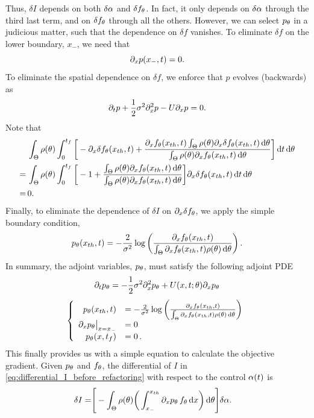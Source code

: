 Thus, $\delta I$ depends on both $\delta \alpha$ and $\delta f_{ \theta}$. 
In fact, it only depends on $\delta \alpha$ through the third last term, and on
$\delta f_{ \theta}$ through all the others.
However, we can select $p_{ \theta}$ in a judicious matter, such that the
dependence on $\delta f$ vanishes. To eliminate $\delta f$ on the lower boundary,
$x_-$, we need that $$ {\partial}_xp(x_-,t)=0.$$
To eliminate the spatial dependence on $\delta f$, we 
enforce that $p$ evolves (backwards) as $${\partial}_t p + \frac{1
}{2}\sigma^2{\partial}_x^2p - U {\partial}_x p = 0.$$
Note that
\begin{align*}
&\, \int_\Theta  \rho({ \theta}) \int_0^{{ t_f }} \bigg[ 
-  {\partial}_x
		\delta f_{ \theta}({ x_{th} }, t)
+    \frac{ {\partial}_x f_{ \theta}({ x_{th} }, t) \int_\Theta \rho({ \theta}) {\partial}_x \delta f_{ \theta}({ x_{th} }, t) 	\, \mathrm{d} { \theta}}{	{\int_\Theta \rho({ \theta}){\partial}_xf_{ \theta}({ x_{th} },
	t)\, \mathrm{d} { \theta} }} 
		 	 \bigg] \, \mathrm{d} t	\, \mathrm{d} { \theta}	   
 \\
 =& \, 
 \int_\Theta  \rho({ \theta}) \int_0^{{ t_f }}  
\bigg[ - 1+    \frac{ \int_\Theta \rho({ \theta}){\partial}_x f_{ \theta}({ x_{th} }, t)\, \mathrm{d} { \theta}}
	     		{	{\int_\Theta \rho({ \theta}){\partial}_xf_{ \theta}({ x_{th} },
                            t)\, \mathrm{d} { \theta} }} 
		 \bigg]   {\partial}_x \delta f_{ \theta}({ x_{th} }, t)	\, \mathrm{d} t
                 \, \mathrm{d} { \theta}	\\
=& \, 0.		 
\end{align*}
Finally, to eliminate the dependence of  $\delta
I$ on ${\partial}_x \delta f_{ \theta}$, we apply the simple boundary
condition, 
$$ p_{ \theta}({ x_{th} },t) = - \frac{2}{\sigma^2} \log\left( \frac{{\partial}_xf_{ \theta}({ x_{th} }, t)}
						{\int_\Theta {\partial}_xf_{ \theta}({ x_{th} }, t)\rho({ \theta})\, \mathrm{d} { \theta} } \right) .$$
In summary, the adjoint variables, $p_{ \theta}$, must satisfy the following adjoint
PDE
\begin{equation*}
{\partial}_t p_{ \theta} =   -\frac{1 }{2}\sigma^2 {\partial}^2_x p_{ \theta} +U(x,t;{ \theta})   {\partial}_x p_{ \theta} \nonumber
\end{equation*}
\begin{equation}
\left \{ \begin{array}{rl}
p_{ \theta} ({ x_{th} },t) &=  - \frac{2}{\sigma^2}\log\left( 
\frac{{\partial}_xf_{ \theta}({ x_{th} }, t)}{\int_\Theta {\partial}_xf_{ \theta}({ x_{th} }, t)\rho({ \theta})\, \mathrm{d} { \theta} } \right) \\
{\partial}_x p_{ \theta}  \big |_{x={ x_{-} }} &= 0\\
p_{ \theta}(x,{ t_f }) &= 0\,.\\
\end{array} \right .
\label{eq:adjoint_pde_OU}
\end{equation}
This finally provides us with a simple equation to calculate the
objective gradient. 
Given $p_{ \theta}$ and $f_{ \theta}$, the differential of $I$ in
\cref{eq:differential_I_before_refactoring} with respect to the
control $\alpha(t)$ is 
\begin{align}
\delta I =&  \Bigg[
-\int_\Theta  \rho({ \theta})  \bigg(  
 \int_{ x_{-} }^{{ x_{th} }} {\partial}_x p_{ \theta} \, f_{ \theta} \, \mathrm{d} x 
    \bigg) \, \mathrm{d} { \theta} \Bigg] \delta \alpha.
    \label{eq:objective_gradient_continuous}
\end{align}

